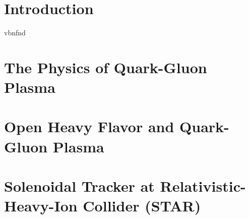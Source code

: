 \documentclass[a4paper,titlepage,11pt,twoside,openright]{report} %
\newcommand{\Lambdac}{\ensuremath{\Lambda_\text{c}}}
\begin{document}
\thispagestyle{fancy}
\renewcommand{\footrulewidth}{0.4pt}


% 


\newpage
% 

\tableofcontents 
\pagestyle{fancy}
\fancyhead{} %
\fancyhead[RE]{\rightmark}
\fancyhead[LO]{\leftmark}

\renewcommand{\footrulewidth}{0.4pt}
\chapter{Introduction}
\setcounter{page}{1}
vbnfnd

\cleardoublepage
\chapter{The Physics of Quark-Gluon Plasma}



\cleardoublepage
\chapter{Open Heavy Flavor and Quark-Gluon Plasma}




\cleardoublepage
\chapter{Solenoidal Tracker at Relativistic-Heavy-Ion Collider (STAR)\label{STARchapter}}


\end{document}
